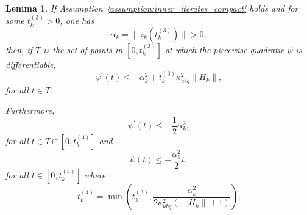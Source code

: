 \documentclass{article}
\numberwithin{equation}{section}
\theoremstyle{plain}
\newtheorem{lemma}[theorem]{Lemma}
\begin{document}
	\begin{lemma}\label{lemma:bound_model_proj_grad_path}
		If Assumption~\ref{assumption:inner_iterates_compact} holds and for some $t_k^{(3)}>0 $, one has
		\[\alpha_k = \|z_k(t_k^{(3)})\| > 0,\]
		then, if $T$ is the set of points in $[0,t_k^{(3)}]$ at which the piecewise quadratic $\psi$ is differentiable, 
		\begin{equation}\label{eq:lemma_ineq_model_derivative_t3}
			\psi^\prime(t) \le -\alpha_k^2 + t_k^{(3)}\kappa_{ubg}^2\|H_k\|,
		\end{equation}
		for all $t\in T$.
		
		Furthermore, 
		\begin{equation*}
			\psi^\prime(t) \le -\dfrac{1}{2}\alpha_k^2 ,
		\end{equation*}
		for all $t\in T \cap [0,t_k^{(4)}]$ and 
		\begin{equation*}
			\psi(t) \le  - \dfrac{\alpha_k^2}{2}t,
		\end{equation*}
		for all $t\in  [0,t_k^{(4)}]$ where 
		\begin{equation}\label{eq:t4_def}
			t_k^{(4)} = \min \left(t_k^{(3)}, \dfrac{\alpha_k^2}{2\kappa_{ubg}^2(\|H_k\|+1)}\right).
		\end{equation}
	\end{lemma}
	
\end{document}
